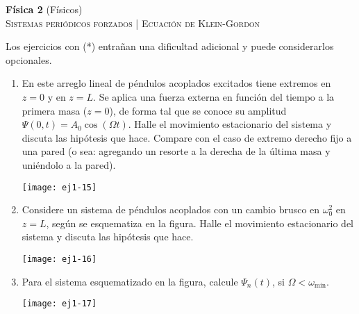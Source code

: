 \documentclass[11pt,spanish,a4paper]{article}
\begin{document}
\begin{center}
\textbf{Física 2} (Físicos) \hfill {}\\
	\textsc{\LARGE Sistemas periódicos forzados | Ecuación de Klein-Gordon}
\end{center}

Los ejercicios con (*) entrañan una dificultad adicional y puede considerarlos opcionales.


\begin{enumerate}

				
\item
\begin{minipage}[t][3.5cm]{0.6\textwidth}
En este arreglo lineal de péndulos acoplados excitados tiene extremos en $z= 0$ y en $z= L$.
Se aplica una fuerza externa en función del tiempo a la primera masa ($z=0$), de forma tal que se conoce su amplitud $\Psi(0,t)= A_0 \cos(\Omega t)$.
Halle el movimiento estacionario del sistema y discuta las hipótesis que hace.
Compare con el caso de extremo derecho fijo a una pared (o sea: agregando un resorte a la derecha de la última masa y uniéndolo a la pared). 
\end{minipage}
\begin{minipage}[c][0cm][t]{0.35\textwidth}
  \texttt{[image: ej1-15]}
\end{minipage}



\item
\begin{minipage}[t][4cm]{0.35\textwidth}
Considere un sistema de péndulos acoplados con un cambio brusco en $\omega_{0}^{2}$ en $z=L$, según se esquematiza en la figura.
Halle el movimiento estacionario del sistema y discuta las hipótesis que hace.
\end{minipage}
\begin{minipage}[c][1cm][t]{0.6\textwidth}
  \texttt{[image: ej1-16]}
\end{minipage}



\item
\begin{minipage}[t][3.5cm]{0.45\textwidth}
Para el sistema esquematizado en la figura, calcule $\Psi_{n}(t)$, si $\Omega<\omega_\textrm{mín}$.
\end{minipage}
\begin{minipage}[c][2cm][t]{0.5\textwidth}
  \texttt{[image: ej1-17]}
\end{minipage}




\end{enumerate}
\end{document}
